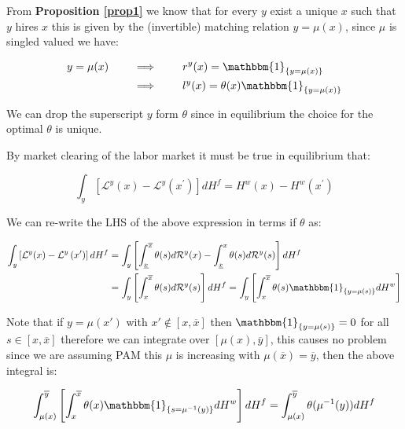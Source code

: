 \documentclass[12pt]{article}
\theoremstyle{definition}
\newcommand{\qiq}{\qquad \implies \qquad}
\begin{document}
From \textbf{Proposition \ref{prop1}} we know that for every $y$ exist a unique $x$ such that $y$ hires $x$ this is given by the (invertible) matching relation $y = \mu(x)$, since $\mu$ is singled valued we have:


\begin{align*}
    y = \mu(x)  &\qiq r^y(x) = \mathbbm{1}_{\{y=\mu(x)\}}\\
                &\qiq l^y(x) = \theta(x)\mathbbm{1}_{\{y=\mu(x)\}}
\end{align*}


We can drop the superscript $y$ form $\theta$ since in equilibrium the choice for the optimal $\theta$ is unique.

By market clearing of the labor market it must be true in equilibrium that:

\begin{equation}\label{mkt_clearing_eq}
\int_{y}\left[\mathcal{L}^{y}(x)-\mathcal{L}^{y}\left(x^{\prime}\right)\right] d H^{f} = H^{w}(x)-H^{w}\left(x^{\prime}\right)
\end{equation}

We can re-write the LHS of the above expression in terms if $\theta$ as:

\begin{align*}
    \int_{y}\left[\mathcal{L}^{y}(x)-\mathcal{L}^{y}\left(x^{\prime}\right)\right] d H^{f} &=  \int_{y}\left[ \int_{\underline{x}}^{\overline{x}}{\theta(s)d\mathcal{R}^y(x)} - \int_{\underline{x}}^{x}{\theta(s)d\mathcal{R}^y(s)} \right] d H^{f} \\
    &=  \int_{y}\left[ \int_{x}^{\overline{x}}{\theta(s)d\mathcal{R}^y(s)} \right] d H^{f} = \int_{y}\left[ \int_{x}^{\overline{x}}{\theta(s)\mathbbm{1}_{\{y=\mu(s)\}}dH^w} \right]
\end{align*}

Note that if $y=\mu(x')$ with $x'\not\in[x,\overline{x}]$ then $\mathbbm{1}_{\{y=\mu(s)\}} = 0$ for all $s\in[x,\overline{x}]$ therefore we can integrate over $[\mu(x), \overline{y}]$, this causes no problem since we are assuming PAM this $\mu$ is increasing with $\mu(\overline{x}) = \overline{y}$, then the above integral is:

\begin{align*}
    \int_{\mu(x)}^{\overline{y}}{ \left[ \int_{x}^{\overline{x}}{\theta(x)} \mathbbm{1}_{\{s=\mu^{-1}(y)\}}dH^w \right] dH^f } = \int_{\mu(x)}^{\overline{y}}{ \theta(\mu^{-1}(y)) dH^f } 
\end{align*}
\end{document}
